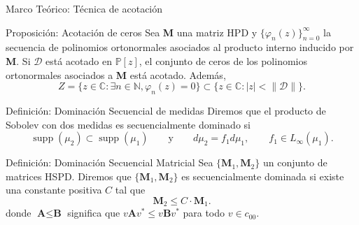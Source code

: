 \begin{frame}{Marco Teórico: Técnica de acotación}
	\footnotesize
	\begin{block}{\footnotesize Proposición: Acotación de ceros \cite{escribano2025boundedness}}
		Sea \textbf{M} una matriz HPD y $\{\varphi_n(z)\}_{n=0}^{\infty}$ la secuencia de polinomios ortonormales asociados al producto interno inducido por \textbf{M}. Si $\mathcal{D}$ está acotado en $\mathbb{P}[z]$, el conjunto de ceros de los polinomios ortonormales asociados a \textbf{M} está acotado. Además,
		$$Z=\{z\in\mathbb{C}: \exists n \in \mathbb{N},\varphi_n(z)=0\} \subset \{z\in\mathbb{C}:|z|<\|\mathcal{D}\|\}.$$
	\end{block}
	\pause
	\begin{block}{\footnotesize Definición: Dominación Secuencial de medidas \cite{lagomasino1999zero}}
		Diremos que el producto de Sobolev con dos medidas es secuencialmente dominado si
		$$\operatorname{supp}(\mu_2) \subset \operatorname{supp}(\mu_{1}) \qquad \text{y} \qquad
			d\mu_2 = f_{1}d\mu_{1}, \qquad f_{1} \in L_{\infty}(\mu_{1}).$$
	\end{block}
	\pause
	\begin{block}{\footnotesize Definición: Dominación Secuencial Matricial \cite{escribano2025boundedness}}
		Sea $\{\textbf{M}_1,\textbf{M}_2\}$ un conjunto de matrices HSPD. Diremos que $\{\textbf{M}_1,\textbf{M}_2\}$ es secuencialmente dominada si existe una constante positiva $C$ tal que
		$$\textbf{M}_2 \leq C \cdot \textbf{M}_{1}.$$
		donde $\textbf{A} \leq \textbf{B}$ significa que $v\textbf{A}v^* \leq v\textbf{B}v^*$ para todo $v \in c_{00}$.
	\end{block}
\end{frame}

